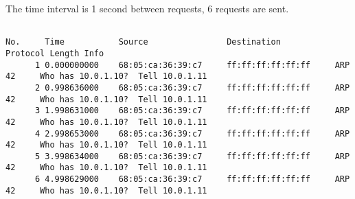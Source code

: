 The time interval is 1 second between requests, 6 requests are sent.

\begin{lstlisting}

No.     Time           Source                Destination           Protocol Length Info
      1 0.000000000    68:05:ca:36:39:c7     ff:ff:ff:ff:ff:ff     ARP      42     Who has 10.0.1.10?  Tell 10.0.1.11
      2 0.998636000    68:05:ca:36:39:c7     ff:ff:ff:ff:ff:ff     ARP      42     Who has 10.0.1.10?  Tell 10.0.1.11
      3 1.998631000    68:05:ca:36:39:c7     ff:ff:ff:ff:ff:ff     ARP      42     Who has 10.0.1.10?  Tell 10.0.1.11
      4 2.998653000    68:05:ca:36:39:c7     ff:ff:ff:ff:ff:ff     ARP      42     Who has 10.0.1.10?  Tell 10.0.1.11
      5 3.998634000    68:05:ca:36:39:c7     ff:ff:ff:ff:ff:ff     ARP      42     Who has 10.0.1.10?  Tell 10.0.1.11
      6 4.998629000    68:05:ca:36:39:c7     ff:ff:ff:ff:ff:ff     ARP      42     Who has 10.0.1.10?  Tell 10.0.1.11

\end{lstlisting}

